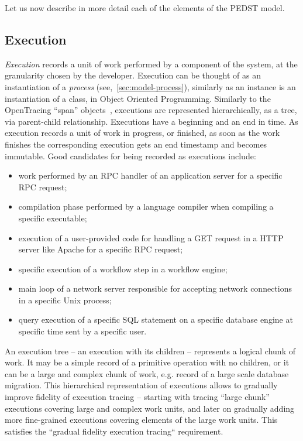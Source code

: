 Let us now describe in more detail each of the elements of the PEDST model.

\subsection{Execution}\label{sec:model-execution}

\textit{Execution} records a unit of work performed by a component of the system, at the granularity chosen by the developer. Execution can be thought of as an instantiation of a \textit{process} (see,~\cref{sec:model-process}), similarly as an instance is an instantiation of a class, in Object Oriented Programming. Similarly to the OpenTracing ``span'' objects~\cite{openTracingOnline}, executions are represented hierarchically, as a tree, via parent-child relationship. Executions have a beginning and an end in time. As execution records a unit of work in progress, or finished, as soon as the work finishes the corresponding execution gets an end timestamp and becomes immutable. Good candidates for being recorded as executions include:
%
\begin{itemize}
	\item work performed by an RPC handler of an application server for a specific RPC request;
	\item compilation phase performed by a language compiler when compiling a specific executable;
	\item execution of a user-provided code for handling a GET request in a HTTP server like Apache for a specific RPC request;
	\item specific execution of a workflow step in a workflow engine;
	\item main loop of a network server responsible for accepting network connections in a specific Unix process;
	\item query execution of a specific SQL statement on a specific database engine at specific time sent by a specific user.
\end{itemize}

An execution tree -- an execution with its children -- represents a logical chunk of work. It may be a simple record of a primitive operation with no children, or it can be a large and complex chunk of work, e.g. record of a large scale database migration. This hierarchical representation of executions allows to gradually improve fidelity of execution tracing -- starting with tracing ``large chunk'' executions covering large and complex work units, and later on gradually adding more fine-grained executions covering elements of the large work units. This satisfies the ``gradual fidelity execution tracing`` requirement.

